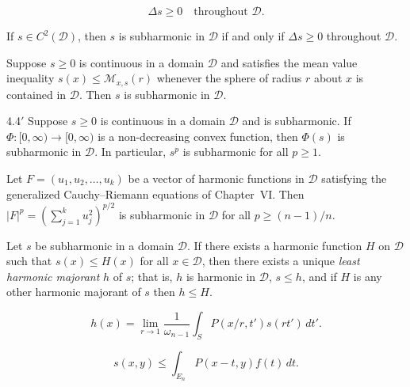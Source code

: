 \begin{equation}\label{eq:c2-4-2}
\Delta s \geq 0 \quad \text{throughout } \mathcal{D}.
\end{equation}

\begin{theorem}\label{thm:c2-4-3}
If $s \in C^2(\mathcal{D})$, then $s$ is subharmonic in $\mathcal{D}$ if and only if $\Delta s \geq 0$ throughout $\mathcal{D}$.
\end{theorem}

\begin{theorem}\label{thm:c2-4-4}
Suppose $s \geq 0$ is continuous in a domain $\mathcal{D}$ and satisfies the mean value inequality $s(x) \leq \mathcal{M}_{x,s}(r)$ whenever the sphere of radius $r$ about $x$ is contained in $\mathcal{D}$. Then $s$ is subharmonic in $\mathcal{D}$.
\end{theorem}

\begin{customthm}{4.4$'$}\label{thm:c2-4-4p}
Suppose $s \geq 0$ is continuous in a domain $\mathcal{D}$ and is subharmonic. If $\Phi : [0, \infty) \to [0, \infty)$ is a non-decreasing convex function, then $\Phi(s)$ is subharmonic in $\mathcal{D}$. In particular, $s^p$ is subharmonic for all $p \geq 1$.
\end{customthm}

\begin{theorem}\label{thm:c2-4-5}
Let $F = (u_1, u_2, \dots, u_k)$ be a vector of harmonic functions in $\mathcal{D}$ satisfying the generalized Cauchy--Riemann equations of Chapter~VI. Then $|F|^p = (\sum_{j=1}^k u_j^2)^{p/2}$ is subharmonic in $\mathcal{D}$ for all $p \geq (n-1)/n$.
\end{theorem}

\begin{theorem}\label{thm:c2-4-6}
Let $s$ be subharmonic in a domain $\mathcal{D}$. If there exists a harmonic function $H$ on $\mathcal{D}$ such that $s(x) \leq H(x)$ for all $x \in \mathcal{D}$, then there exists a unique \emph{least harmonic majorant} $h$ of $s$; that is, $h$ is harmonic in $\mathcal{D}$, $s \leq h$, and if $H$ is any other harmonic majorant of $s$ then $h \leq H$.
\end{theorem}

\begin{equation}\label{eq:c2-4-7}
h(x) = \lim_{r \to 1} \frac{1}{\omega_{n-1}} \int_S P(x/r, t') s(rt')\,dt'.
\end{equation}

\begin{equation}\label{eq:c2-4-8}
s(x, y) \leq \int_{E_n} P(x - t, y) f(t)\,dt.
\end{equation}

